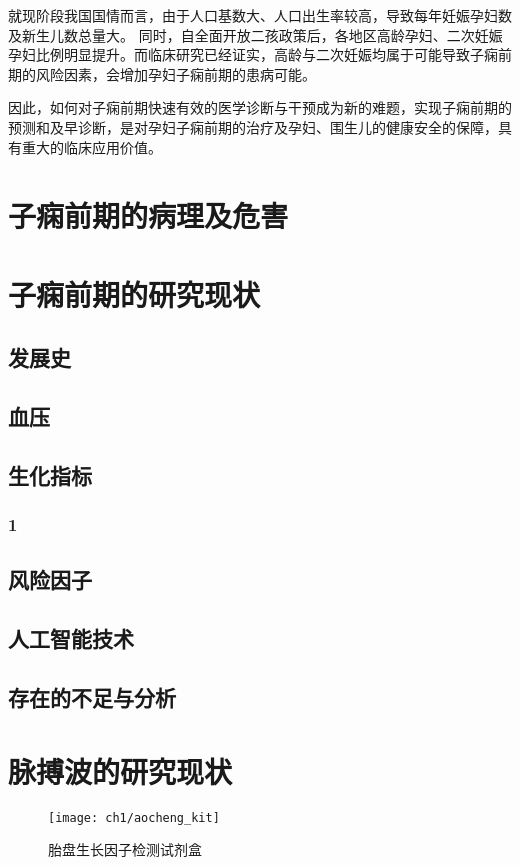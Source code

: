 就现阶段我国国情而言，由于人口基数大、人口出生率较高，导致每年妊娠孕妇数及新生儿数总量大。
同时，自全面开放二孩政策后，各地区高龄孕妇、二次妊娠孕妇比例明显提升。而临床研究已经证实，高龄与二次妊娠均属于可能导致子痫前期的风险因素，会增加孕妇子痫前期的患病可能。

因此，如何对子痫前期快速有效的医学诊断与干预成为新的难题，实现子痫前期的预测和及早诊断，是对孕妇子痫前期的治疗及孕妇、围生儿的健康安全的保障，具有重大的临床应用价值。
\section{子痫前期的病理及危害}

\section{子痫前期的研究现状}
\subsection{发展史}
\subsection{血压}
\subsection{生化指标}
\subsubsection{1}
\subsection{风险因子}
\subsection{人工智能技术}
\subsection{存在的不足与分析}

\section{脉搏波的研究现状}

\begin{figure}[htbp]
    \centering
    \texttt{[image: ch1/aocheng\_kit]}
    \caption{\label{fig:aocheng_kit}胎盘生长因子检测试剂盒}
\end{figure}

